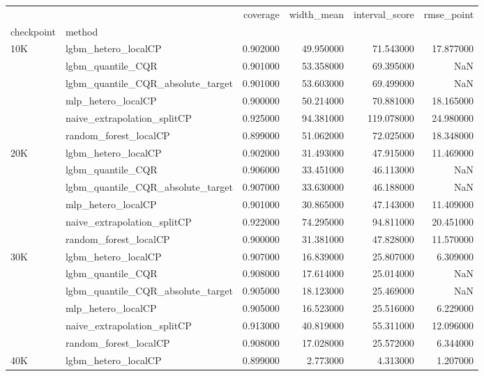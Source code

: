 \begin{tabular}{llrrrr}
\toprule
 &  & coverage & width\_mean & interval\_score & rmse\_point \\
checkpoint & method &  &  &  &  \\
\midrule
\multirow[t]{6}{*}{10K} & lgbm\_hetero\_localCP & 0.902000 & 49.950000 & 71.543000 & 17.877000 \\
 & lgbm\_quantile\_CQR & 0.901000 & 53.358000 & 69.395000 & NaN \\
 & lgbm\_quantile\_CQR\_absolute\_target & 0.901000 & 53.603000 & 69.499000 & NaN \\
 & mlp\_hetero\_localCP & 0.900000 & 50.214000 & 70.881000 & 18.165000 \\
 & naive\_extrapolation\_splitCP & 0.925000 & 94.381000 & 119.078000 & 24.980000 \\
 & random\_forest\_localCP & 0.899000 & 51.062000 & 72.025000 & 18.348000 \\
\cline{1-6}
\multirow[t]{6}{*}{20K} & lgbm\_hetero\_localCP & 0.902000 & 31.493000 & 47.915000 & 11.469000 \\
 & lgbm\_quantile\_CQR & 0.906000 & 33.451000 & 46.113000 & NaN \\
 & lgbm\_quantile\_CQR\_absolute\_target & 0.907000 & 33.630000 & 46.188000 & NaN \\
 & mlp\_hetero\_localCP & 0.901000 & 30.865000 & 47.143000 & 11.409000 \\
 & naive\_extrapolation\_splitCP & 0.922000 & 74.295000 & 94.811000 & 20.451000 \\
 & random\_forest\_localCP & 0.900000 & 31.381000 & 47.828000 & 11.570000 \\
\cline{1-6}
\multirow[t]{6}{*}{30K} & lgbm\_hetero\_localCP & 0.907000 & 16.839000 & 25.807000 & 6.309000 \\
 & lgbm\_quantile\_CQR & 0.908000 & 17.614000 & 25.014000 & NaN \\
 & lgbm\_quantile\_CQR\_absolute\_target & 0.905000 & 18.123000 & 25.469000 & NaN \\
 & mlp\_hetero\_localCP & 0.905000 & 16.523000 & 25.516000 & 6.229000 \\
 & naive\_extrapolation\_splitCP & 0.913000 & 40.819000 & 55.311000 & 12.096000 \\
 & random\_forest\_localCP & 0.908000 & 17.028000 & 25.572000 & 6.344000 \\
\cline{1-6}
\multirow[t]{6}{*}{40K} & lgbm\_hetero\_localCP & 0.899000 & 2.773000 & 4.313000 & 1.207000 \\

\end{tabular}
